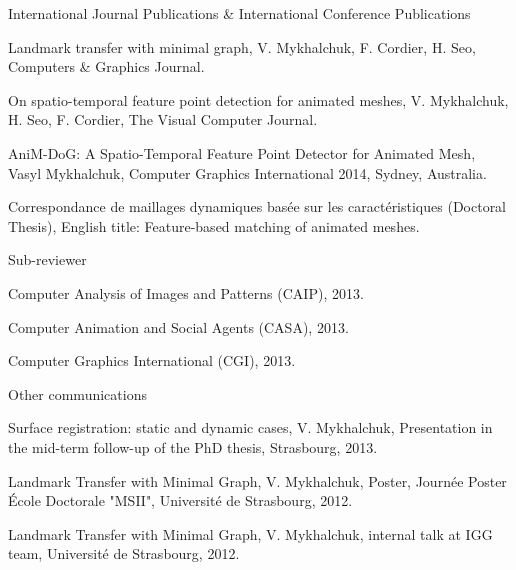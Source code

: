 
\begin{cventries}
  \cventry
    {} %
    {International Journal Publications \& International Conference Publications} %
    { } %
    { } %
    {
      \begin{cvitems} %
        \item {Landmark transfer with minimal graph, V. Mykhalchuk, F. Cordier, H. Seo, Computers \& Graphics Journal.}
        \item {On spatio-temporal feature point detection for animated meshes, V. Mykhalchuk, H. Seo, F. Cordier, The Visual Computer Journal.}
        \item {AniM-DoG: A Spatio-Temporal Feature Point Detector for Animated Mesh, Vasyl Mykhalchuk, Computer Graphics International 2014, Sydney, Australia.}
        \item {Correspondance de maillages dynamiques basée sur les caractéristiques (Doctoral Thesis), English title: Feature-based matching of animated meshes.}
      \vspace{-5.0mm}
      \end{cvitems}
    }
   
   \cventry
   {}
   {\vspace{-7.0mm}Sub-reviewer}
   {}
   {}
   {
     \begin{cvitems}
     \item{Computer Analysis of Images and Patterns (CAIP), 2013.}
     \item{Computer Animation and Social Agents (CASA), 2013.}
	 \item{Computer Graphics International (CGI), 2013.}
	 \vspace{-5.0mm}
     \end{cvitems}
   } %
   
   \cventry
   {}
   {\vspace{-7.0mm}Other communications}
   {}
   {}
   {
     \begin{cvitems}
     \item Surface registration: static and dynamic cases, V. Mykhalchuk, Presentation in the mid-term  follow-up of the PhD thesis, Strasbourg, 2013. 
\item Landmark Transfer with Minimal Graph, V. Mykhalchuk, Poster, Journée Poster École Doctorale  "MSII", Université de Strasbourg, 2012. 
\item Landmark Transfer with Minimal Graph, V. Mykhalchuk, internal talk at IGG team, Université  de Strasbourg, 2012.
\vspace{-0.0mm}
     \end{cvitems}
   }
   

\end{cventries}

